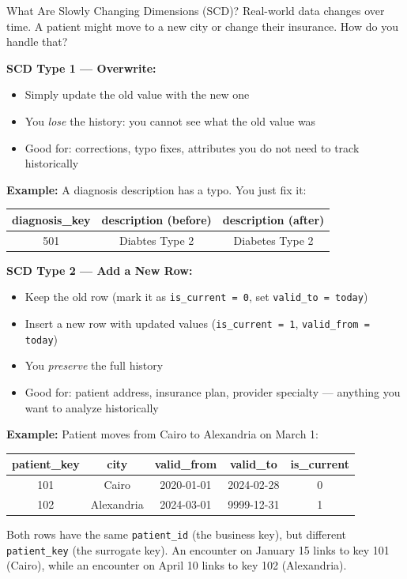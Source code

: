 \documentclass[12pt, a4paper, oneside]{report}
\begin{document}
\begin{conceptbox}{What Are Slowly Changing Dimensions (SCD)?}
Real-world data changes over time. A patient might move to a new city or change their insurance. How do you handle that?

\textbf{SCD Type 1 --- Overwrite:}
\begin{itemize}
    \item Simply update the old value with the new one
    \item You \textit{lose} the history: you cannot see what the old value was
    \item Good for: corrections, typo fixes, attributes you do not need to track historically
\end{itemize}

\textbf{Example:} A diagnosis description has a typo. You just fix it:
\begin{center}
\small
\begin{tabular}{ccc}
    \toprule
    \textbf{diagnosis\_key} & \textbf{description (before)} & \textbf{description (after)} \\
    \midrule
    501 & Diabtes Type 2 & Diabetes Type 2 \\
    \bottomrule
\end{tabular}
\end{center}

\textbf{SCD Type 2 --- Add a New Row:}
\begin{itemize}
    \item Keep the old row (mark it as \texttt{is\_current = 0}, set \texttt{valid\_to = today})
    \item Insert a new row with updated values (\texttt{is\_current = 1}, \texttt{valid\_from = today})
    \item You \textit{preserve} the full history
    \item Good for: patient address, insurance plan, provider specialty --- anything you want to analyze historically
\end{itemize}

\textbf{Example:} Patient moves from Cairo to Alexandria on March 1:
\begin{center}
\small
\begin{tabular}{ccccc}
    \toprule
    \textbf{patient\_key} & \textbf{city} & \textbf{valid\_from} & \textbf{valid\_to} & \textbf{is\_current} \\
    \midrule
    101 & Cairo & 2020-01-01 & 2024-02-28 & 0 \\
    102 & Alexandria & 2024-03-01 & 9999-12-31 & 1 \\
    \bottomrule
\end{tabular}
\end{center}
Both rows have the same \texttt{patient\_id} (the business key), but different \texttt{patient\_key} (the surrogate key). An encounter on January 15 links to key 101 (Cairo), while an encounter on April 10 links to key 102 (Alexandria).


\end{conceptbox}
\end{document}
